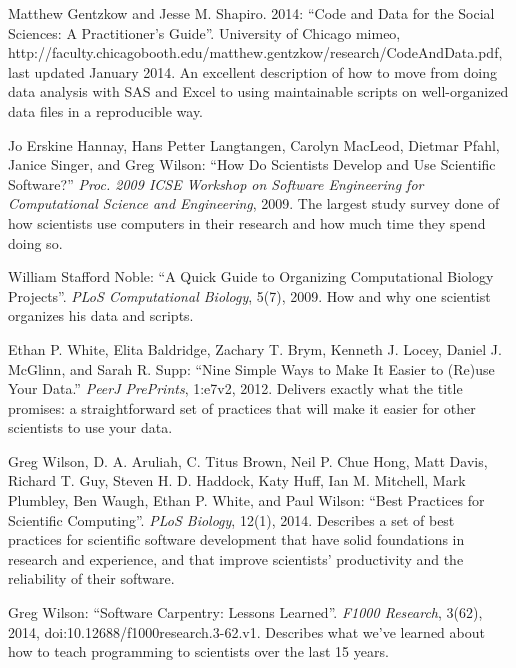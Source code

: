 Matthew Gentzkow and Jesse M. Shapiro. 2014: ``Code and Data for
the Social Sciences: A Practitioner's Guide''. University of Chicago
mimeo,
http://faculty.chicagobooth.edu/matthew.gentzkow/research/CodeAndData.pdf,
last updated January 2014.
An excellent description of how to move from doing data analysis with
SAS and Excel to using maintainable scripts on well-organized data files
in a reproducible way.

Jo Erskine Hannay, Hans Petter Langtangen, Carolyn MacLeod,
Dietmar Pfahl, Janice Singer, and Greg Wilson: ``How Do Scientists
Develop and Use Scientific Software?'' \emph{Proc. 2009 ICSE Workshop on
Software Engineering for Computational Science and Engineering}, 2009.
The largest study survey done of how scientists use computers in their
research and how much time they spend doing so.

William Stafford Noble: ``A Quick Guide to Organizing
Computational Biology Projects''. \emph{PLoS Computational Biology},
5(7), 2009.
How and why one scientist organizes his data and scripts.

Ethan P. White, Elita Baldridge, Zachary T. Brym, Kenneth J.
Locey, Daniel J. McGlinn, and Sarah R. Supp: ``Nine Simple Ways to Make
It Easier to (Re)use Your Data.'' \emph{PeerJ PrePrints}, 1:e7v2, 2012.
Delivers exactly what the title promises: a straightforward set of
practices that will make it easier for other scientists to use your
data.

Greg Wilson, D. A. Aruliah, C. Titus Brown, Neil P. Chue Hong,
Matt Davis, Richard T. Guy, Steven H. D. Haddock, Katy Huff, Ian M.
Mitchell, Mark Plumbley, Ben Waugh, Ethan P. White, and Paul Wilson:
``Best Practices for Scientific Computing''. \emph{PLoS Biology}, 12(1),
2014.
Describes a set of best practices for scientific software development
that have solid foundations in research and experience, and that improve
scientists' productivity and the reliability of their software.

Greg Wilson: ``Software Carpentry: Lessons Learned''. \emph{F1000
Research}, 3(62), 2014,
doi:10.12688/f1000research.3-62.v1.
Describes what we've learned about how to teach programming to
scientists over the last 15 years.
